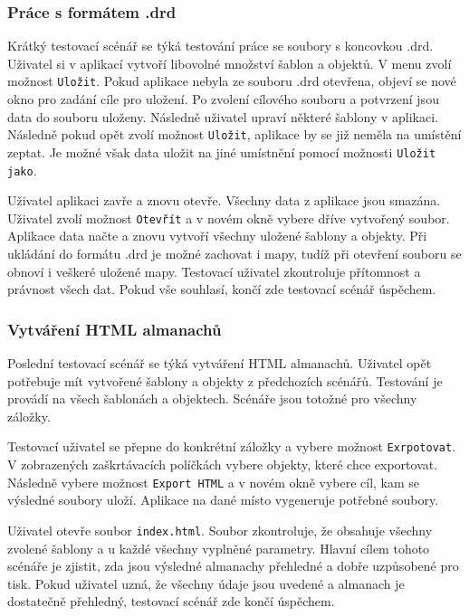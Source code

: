 \documentclass[thesis=B,czech]{resources/FITthesis}[2012/06/26]
\begin{document}
\subsubsection{Práce s formátem .drd}
Krátký testovací scénář se týká testování práce se soubory s koncovkou .drd. Uživatel si v aplikací vytvoří libovolné množství šablon a objektů. V menu zvolí možnost \texttt{Uložit}. Pokud aplikace nebyla ze souboru .drd otevřena, objeví se nové okno pro zadání cíle pro uložení. Po zvolení cílového souboru a potvrzení jsou data do souboru uloženy. Následně uživatel upraví některé šablony v aplikaci. Následně pokud opět zvolí možnost \texttt{Uložit}, aplikace by se již neměla na umístění zeptat. Je možné však data uložit na jiné umístnění pomocí možnosti \texttt{Uložit jako}. \par

Uživatel aplikaci zavře a znovu otevře. Všechny data z aplikace jsou smazána. Uživatel zvolí možnost \texttt{Otevřít} a v novém okně vybere dříve vytvořený soubor. Aplikace data načte a znovu vytvoří všechny uložené šablony a objekty. Při ukládání do formátu .drd je možné zachovat i mapy, tudíž při otevření souboru se obnoví i veškeré uložené mapy. Testovací uživatel zkontroluje přítomnost a právnost všech dat. Pokud vše souhlasí, končí zde testovací scénář úspěchem.

\subsubsection{Vytváření HTML almanachů}
Poslední testovací scénář se týká vytváření HTML almanachů. Uživatel opět potřebuje mít vytvořené šablony a objekty z předchozích scénářů. Testování je provádí na všech šablonách a objektech. Scénáře jsou totožné pro všechny záložky. \par

Testovací uživatel se přepne do konkrétní záložky a vybere možnost \texttt{Exrpotovat}. V zobrazených zaškrtávacích políčkách vybere objekty, které chce exportovat. Následně vybere možnost \texttt{Export HTML} a v novém okně vybere cíl, kam se výsledné soubory uloží. Aplikace na dané místo vygeneruje potřebné soubory. \par

Uživatel otevře soubor \texttt{index.html}. Soubor zkontroluje, že obsahuje všechny zvolené šablony a u každé všechny vyplněné parametry. Hlavní cílem tohoto scénáře je zjistit, zda jsou výsledné almanachy přehledné a dobře uzpůsobené pro tisk. Pokud uživatel uzná, že všechny údaje jsou uvedené a almanach je dostatečně přehledný, testovací scénář zde končí úspěchem. 
\end{document}
